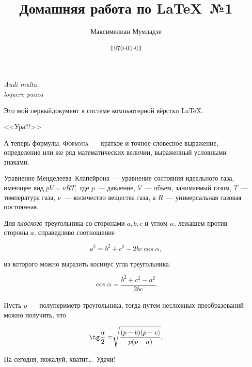\documentclass[12pt]{article}
\title{Домашняя работа по \LaTeX ~№1}
\author{Максимелиан Мумладзе}
\date{\today}
\begin{document}
\maketitle\tableofcontents\newpage\pagebreak

\begin{flushright}
\hfill\textit{Audi multa,\\loquere pauca}
\end{flushright}

\vspace{20pt}

Это мой первый\iffalse в кольце вычета $\approx 20$)\fi документ в системе компьютерной вёрстки \LaTeX.

\begin{center}
\Huge{\sffamily <<Ура!!!>>}
\end{center}

А теперь формулы. \textsc{Формула}~--- краткое и точное словесное выражение, определение или же ряд математических величин, выраженный условными знаками.

\vspace{15pt}

\hspace{28pt}{\large\bfseries Термодинамика}

Уравнение Менделеева--Клапейрона~--- уравнение состояния идеального газа, имеющее вид $pV = \nu RT,$ где $p$~--- давление, $V$~--- объем, занимаемый газом, $T$~--- температура газа, $\nu$~--- количество вещества газа, а $R$~--- универсальная газовая постоянная.

\vspace{15pt}

\hspace{28pt}{\large\bfseries Геометрия \hfill Планиметрия}

Для \textsl{плоского} треугольника со сторонами $a, b, c$ и углом $\alpha$, лежащем против стороны $a$, справедливо соотношение

$$
a^2 = b^2 + c^2 - 2bc\cos\alpha,
$$

из которого можно выразить косинус угла треугольника:

$$
\cos\alpha = \frac{b^2 + c^2 - a^2}{2bc}.
$$\\

Пусть $p$~--- полупериметр треугольника, тогда путем несложных преобразований можно получить, что 

$$
\tg\frac{\alpha}{2} = \sqrt[]{\frac{(p - b)(p - c)}{p(p - a)}},
$$

\vspace{1cm}

На сегодня, пожалуй, хватит\dots ~Удачи!
\end{document}
